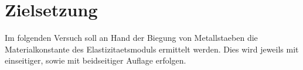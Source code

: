 \section{Zielsetzung}
Im folgenden Versuch soll an Hand der Biegung von Metallstaeben die Materialkonstante des Elastizitaetsmoduls ermittelt werden. Dies wird jeweils mit einseitiger, sowie mit beidseitiger Auflage erfolgen.